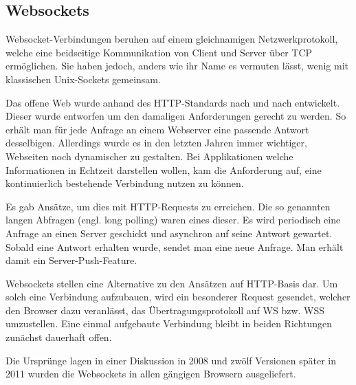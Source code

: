 \subsection{Websockets}
Websocket-Verbindungen beruhen auf einem gleichnamigen Netzwerkprotokoll, welche eine beidseitige Kommunikation von Client und Server über \acs{TCP} ermöglichen.
Sie haben jedoch, anders wie ihr Name es vermuten lässt, wenig mit klassischen Unix-Sockets gemeinsam.
\par
Das offene Web wurde anhand des HTTP-Standards nach und nach entwickelt.
Dieser wurde entworfen um den damaligen Anforderungen gerecht zu werden.
So erhält man für jede Anfrage an einem Webserver eine passende Antwort desselbigen.
Allerdings wurde es in den letzten Jahren immer wichtiger, Webseiten noch dynamischer zu gestalten.
Bei Applikationen welche Informationen in Echtzeit darstellen wollen, kam die Anforderung auf, eine kontinuierlich bestehende Verbindung nutzen zu können.
\par
Es gab Ansätze, um dies mit HTTP-Requests zu erreichen.
Die so genannten langen Abfragen (engl. long polling) waren eines dieser.
Es wird periodisch eine Anfrage an einen Server geschickt und asynchron auf seine Antwort gewartet.
Sobald eine Antwort erhalten wurde, sendet man eine neue Anfrage.
Man erhält damit ein Server-Push-Feature.
\par
Websockets stellen eine Alternative zu den Ansätzen auf HTTP-Basis dar.
Um solch eine Verbindung aufzubauen, wird ein besonderer Request gesendet, welcher den Browser dazu veranlässt, das Übertragungsprotokoll auf WS bzw. WSS umzustellen.
Eine einmal aufgebaute Verbindung bleibt in beiden Richtungen zunächst dauerhaft offen.
\par
Die Ursprünge lagen in einer Diskussion in 2008 und zwölf Versionen später in 2011 wurden die Websockets in allen gängigen Browsern ausgeliefert. 


